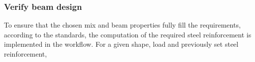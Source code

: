 \subsubsection{Verify beam design}


To ensure that the chosen mix and beam properties fully fill the requirements, according to the standards, the computation of the required steel reinforcement is implemented in the workflow.
For a given shape, load and previously set steel reinforcement, 